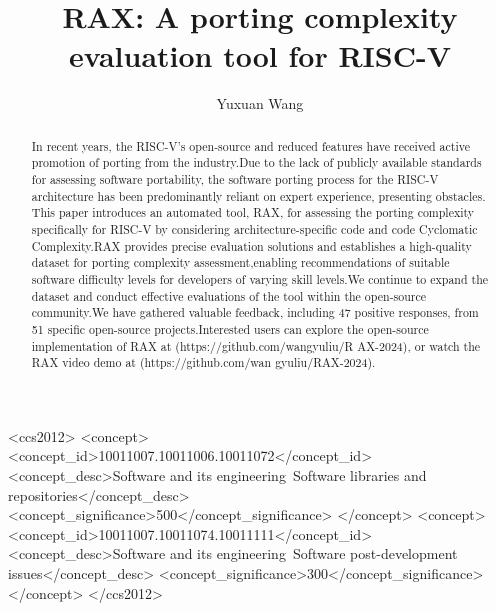 \documentclass[sigconf,screen,review,anonymous]{acmart}
\begin{document}
\title{RAX: A porting complexity evaluation tool for RISC-V}

\author{Yuxuan Wang}

\renewcommand{\shortauthors}{Yuxuan et al.}

\begin{abstract}
  In recent years, the RISC-V’s open-source and reduced features have received active promotion of porting from the industry.Due to the lack of publicly available standards for assessing software portability, the software porting process for the RISC-V architecture has been predominantly reliant on expert experience, presenting obstacles. This paper introduces an automated tool, RAX, for assessing the porting complexity specifically for RISC-V by considering architecture-specific code and code Cyclomatic Complexity.RAX provides precise evaluation solutions and establishes a high-quality dataset for porting complexity assessment,enabling recommendations of suitable software difficulty levels for developers of varying skill levels.We continue to expand the dataset and conduct effective evaluations of the tool within the open-source community.We have gathered valuable feedback, including 47 positive responses, from 51 specific open-source projects.Interested users can explore the open-source implementation of RAX at (https://github.com/wangyuliu/R
  AX-2024), or watch the RAX video demo at (https://github.com/wan
  gyuliu/RAX-2024).
\end{abstract}

\begin{CCSXML}
<ccs2012>
    <concept>
        <concept_id>10011007.10011006.10011072</concept_id>
        <concept_desc>Software and its engineering~Software libraries and repositories</concept_desc>
        <concept_significance>500</concept_significance>
        </concept>
    <concept>
        <concept_id>10011007.10011074.10011111</concept_id>
        <concept_desc>Software and its engineering~Software post-development issues</concept_desc>
        <concept_significance>300</concept_significance>
    </concept>
</ccs2012>
\end{CCSXML}
  
\end{document}
